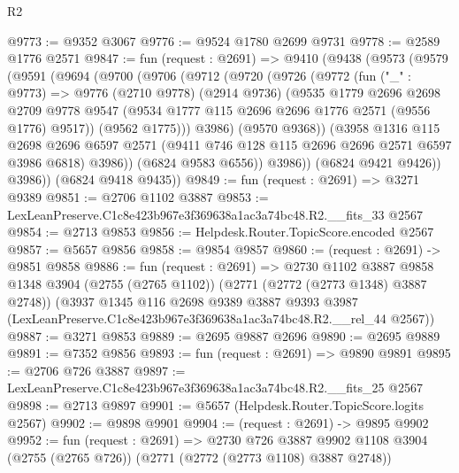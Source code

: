 \begin{lexlean}{R2}
\begin{coremodule}
@9773 := @9352 @3067
@9776 := @9524 @1780 @2699 @9731
@9778 := @2589 @1776 @2571
@9847 := fun (request : @2691) =>
  @9410
    (@9438
      (@9573
        (@9579
          (@9591
            (@9694
              (@9700
                (@9706
                  (@9712
                    (@9720
                      (@9726
                        (@9772
                          (fun ("_" : @9773) =>
                          @9776
                            (@2710 @9778)
                            (@2914 @9736)
                            (@9535
                              @1779
                              @2696
                              @2698
                              @2709
                              @9778
                              @9547
                              (@9534 @1777 @115 @2696 @2696 @1776 @2571 (@9556 @1776) @9517))
                            (@9562 @1775)))
                        @3986)
                      (@9570 @9368))
                    (@3958
                      @1316
                      @115
                      @2698
                      @2696
                      @6597
                      @2571
                      (@9411 @746 @128 @115 @2696 @2696 @2571 @6597 @3986 @6818)
                      @3986))
                  (@6824 @9583 @6556))
                @3986))
            (@6824 @9421 @9426))
          @3986))
      (@6824 @9418 @9435))
@9849 := fun (request : @2691) => @3271 @9389
@9851 := @2706 @1102 @3887
@9853 := LexLeanPreserve.C1c8e423b967e3f369638a1ac3a74bc48.R2.__fits_33 @2567
@9854 := @2713 @9853
@9856 := Helpdesk.Router.TopicScore.encoded @2567
@9857 := @5657 @9856
@9858 := @9854 @9857
@9860 := (request : @2691) -> @9851 @9858
@9886 := fun (request : @2691) =>
  @2730
    @1102
    @3887
    @9858
    @1348
    @3904
    (@2755 (@2765 @1102))
    (@2771 (@2772 (@2773 @1348) @3887 @2748))
    (@3937
      @1345
      @116
      @2698
      @9389
      @3887
      @9393
      @3987
      (LexLeanPreserve.C1c8e423b967e3f369638a1ac3a74bc48.R2.__rel_44 @2567))
@9887 := @3271 @9853
@9889 := @2695 @9887 @2696
@9890 := @2695 @9889
@9891 := @7352 @9856
@9893 := fun (request : @2691) => @9890 @9891
@9895 := @2706 @726 @3887
@9897 := LexLeanPreserve.C1c8e423b967e3f369638a1ac3a74bc48.R2.__fits_25 @2567
@9898 := @2713 @9897
@9901 := @5657 (Helpdesk.Router.TopicScore.logits @2567)
@9902 := @9898 @9901
@9904 := (request : @2691) -> @9895 @9902
@9952 := fun (request : @2691) =>
  @2730
    @726
    @3887
    @9902
    @1108
    @3904
    (@2755 (@2765 @726))
    (@2771 (@2772 (@2773 @1108) @3887 @2748))

\end{coremodule}
\end{lexlean}
